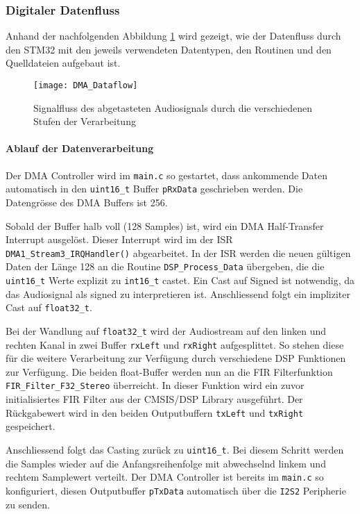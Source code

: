 \subsubsection{Digitaler Datenfluss}
\label{sec:Dataflow}

Anhand der nachfolgenden Abbildung \ref{pic:DMA_Dataflow} wird gezeigt, wie der Datenfluss durch den STM32 mit den jeweils verwendeten Datentypen, den Routinen und den Quelldateien aufgebaut ist.

\begin{figure}[H]
	\centering
	\texttt{[image: DMA\_Dataflow]}
	\caption{Signalfluss des abgetasteten Audiosignals durch die verschiedenen Stufen der Verarbeitung}
	\label{pic:DMA_Dataflow}
\end{figure}


\paragraph{Ablauf der Datenverarbeitung}

Der DMA Controller wird im \texttt{main.c} so gestartet, dass ankommende Daten automatisch in den \texttt{uint16\_t} Buffer \texttt{pRxData} geschrieben werden. Die Datengrösse des DMA Buffers ist 256. 

Sobald der Buffer halb voll (128 Samples) ist, wird ein DMA Half-Transfer Interrupt ausgelöst.
Dieser Interrupt wird im der ISR \texttt{DMA1\_Stream3\_IRQHandler()} abgearbeitet. 
In der ISR werden die neuen gültigen Daten der Länge 128 an die Routine \texttt{DSP\_Process\_Data} übergeben, die die \texttt{uint16\_t} Werte explizit zu \texttt{int16\_t} castet. Ein Cast auf Signed ist notwendig, da das Audiosignal als signed zu interpretieren ist. Anschliessend folgt ein impliziter Cast auf \texttt{float32\_t}.

Bei der Wandlung auf \texttt{float32\_t} wird der Audiostream auf den linken und rechten Kanal in zwei Buffer \texttt{rxLeft} und \texttt{rxRight} aufgesplittet.
So stehen diese für die weitere Verarbeitung zur Verfügung durch verschiedene DSP Funktionen zur Verfügung.
Die beiden float-Buffer werden nun an die FIR Filterfunktion \texttt{FIR\_Filter\_F32\_Stereo} überreicht. In dieser Funktion wird ein zuvor initialisiertes FIR Filter aus der CMSIS/DSP Library ausgeführt.
Der Rückgabewert wird in den beiden Outputbuffern \texttt{txLeft} und \texttt{txRight} gespeichert.

Anschliessend folgt das Casting zurück zu \texttt{uint16\_t}. Bei diesem Schritt werden die Samples wieder auf die Anfangsreihenfolge mit abwechselnd linkem und rechtem Samplewert verteilt.
Der DMA Controller ist bereits im \texttt{main.c} so konfiguriert, diesen Outputbuffer \texttt{pTxData} automatisch über die \texttt{I2S2} Peripherie zu senden.

